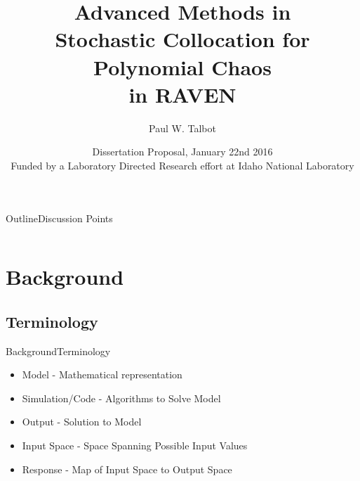 \documentclass{beamer}
\title[UQ in RAVEN] %
{Advanced Methods in \\Stochastic Collocation for Polynomial Chaos\\in RAVEN}
\author[Talbot] %
{Paul W. Talbot}%
\institute[University of New Mexico] %
{
  University of New Mexico%
}
\date[Jan 22 2016] %
{Dissertation Proposal, January 22nd 2016\\\vspace{10pt}\small Funded by a Laboratory Directed Research effort at Idaho National Laboratory}
\begin{document}
\AtBeginSection[]{\begin{frame}{Outline}\vspace{-20pt}
  \tableofcontents[currentsection,hideothersubsections]%
\end{frame}}

\begin{frame}
  \titlepage
\end{frame}


\begin{frame}{Outline}{Discussion Points}
  \begin{columns}
  \begin{column}{0.1\textwidth}
  \end{column}
  \begin{column}{0.9\textwidth}
    \setcounter{tocdepth}{2}
    \tableofcontents[]
  \end{column}
  \end{columns}
\end{frame}

\section{Background}

\subsection{Terminology}
\begin{frame}{Background}{Terminology}
  \begin{itemize}
  \item Model - Mathematical representation
  \item Simulation/Code - Algorithms to Solve Model
  \item Output - Solution to Model \vspace{20pt}
  \item Input Space - Space Spanning Possible Input Values
  \item Response - Map of Input Space to Output Space
  \end{itemize}
\end{frame}
\end{document}
